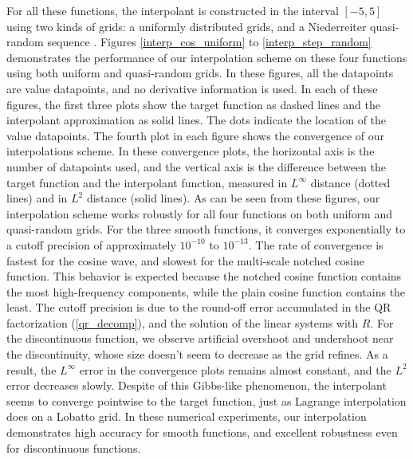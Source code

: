 \clearpage
For all these functions, the interpolant is constructed in the interval
$[-5,5]$ using two kinds of grids: a uniformly distributed grids,
and a Niederreiter quasi-random sequence \cite[]{niederreiter}.
Figures \ref{interp_cos_uniform} to
\ref{interp_step_random} demonstrates the performance of our interpolation
scheme on these four functions using both uniform and quasi-random grids.
In these figures, all the datapoints are value datapoints, and no derivative
information is used.  In each of these figures, the first three plots show
the target function as dashed lines and the interpolant approximation as solid
lines.  The dots indicate the location of the value datapoints.  The fourth
plot in each figure shows the convergence of our interpolations scheme.
In these convergence plots, the horizontal axis is the number of datapoints
used, and the vertical axis is the difference between the target function
and the interpolant function, measured in $L^\infty$ distance (dotted lines)
and in $L^2$ distance (solid lines).  As can be seen from these figures,
our interpolation scheme works robustly for all four functions on both uniform
and quasi-random grids.  For the three smooth functions, it
converges exponentially to a cutoff precision of approximately $10^{-10}$
to $10^{-13}$.  The rate of convergence is fastest for the cosine wave, and
slowest for the multi-scale notched cosine function.  This behavior is expected
because the notched cosine function contains the most high-frequency
components, while the plain cosine function contains the least.
The cutoff precision is due to the round-off error accumulated in the QR
factorization (\ref{qr_decomp}), and the solution of the linear systems with
$R$.
For the discontinuous function, we observe artificial overshoot and undershoot
near the discontinuity, whose size doesn't seem to decrease as the grid refines.
As a result, the $L^\infty$ error in the convergence plots remains almost
constant, and the $L^2$ error decreases slowly.  Despite of this Gibbs-like
phenomenon, the interpolant seems to converge pointwise to the target
function, just as Lagrange interpolation does on a Lobatto grid.
In these numerical experiments, our interpolation demonstrates high accuracy
for smooth functions, and excellent robustness even for discontinuous
functions.

